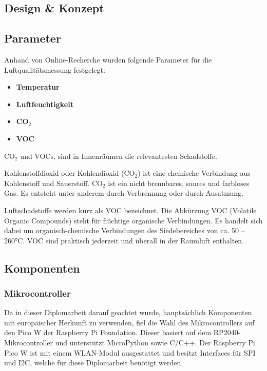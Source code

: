 \begin{inhalt}
\chapter{Design \& Konzept}
\renewcommand*\chapterpagestyle{scrheadings}

\section{Parameter}

Anhand von Online-Recherche \cite{Luftparameter1, Luftparameter2} wurden folgende Parameter für die Luftqualitätsmessung festgelegt:

\begin{itemize}
    \item \textbf{Temperatur}
    \item \textbf{Luftfeuchtigkeit}
    \item \textbf{CO$_2$}
    \item \textbf{VOC}
\end{itemize}

CO$_2$ und VOCs, sind in Innenräumen die relevantesten Schadstoffe. 

\smallskip

Kohlenstoffdioxid oder Kohlendioxid (CO$_2$) ist eine chemische Verbindung aus Kohlenstoff und Sauerstoff. CO$_2$ ist ein nicht brennbares, saures und farbloses Gas. Es entsteht unter anderem durch Verbrennung oder durch Ausatmung. \cite{CO2Wiki}

\smallskip

Luftschadstoffe werden kurz als VOC bezeichnet. Die Abkürzung VOC (Volatile Organic Compounds) steht für flüchtige organische Verbindungen. Es handelt sich dabei um organisch-chemische Verbindungen des Siedebereiches von ca. 50 – 260°C. VOC sind praktisch jederzeit und überall in der Raumluft enthalten. \cite{Luftparameter1}


\section{Komponenten}

\subsection{Mikrocontroller}

Da in dieser Diplomarbeit darauf geachtet wurde, hauptsächlich Komponenten mit europäischer Herkunft zu verwenden, fiel die Wahl des Mikrocontrollers auf den Pico W der Raspberry Pi Foundation. Dieser basiert auf dem RP2040-Mikrocontroller und unterstützt MicroPython sowie C/C++. Der Raspberry Pi Pico W ist mit einem WLAN-Modul ausgestattet und besitzt Interfaces für SPI und I2C, welche für diese Diplomarbeit benötigt werden. \cite{Raspberry_Pi_Pico_W}


\end{inhalt}
